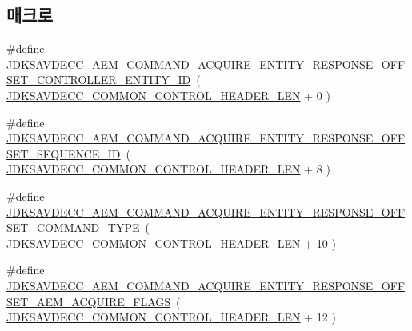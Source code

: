 \subsection*{매크로}
\begin{DoxyCompactItemize}
\item 
\#define \hyperlink{group__command__acquire__entity__response_ga0d13e0e50bafffb57a69a21b7de6083e}{J\+D\+K\+S\+A\+V\+D\+E\+C\+C\+\_\+\+A\+E\+M\+\_\+\+C\+O\+M\+M\+A\+N\+D\+\_\+\+A\+C\+Q\+U\+I\+R\+E\+\_\+\+E\+N\+T\+I\+T\+Y\+\_\+\+R\+E\+S\+P\+O\+N\+S\+E\+\_\+\+O\+F\+F\+S\+E\+T\+\_\+\+C\+O\+N\+T\+R\+O\+L\+L\+E\+R\+\_\+\+E\+N\+T\+I\+T\+Y\+\_\+\+ID}~( \hyperlink{group__jdksavdecc__avtp__common__control__header_gaae84052886fb1bb42f3bc5f85b741dff}{J\+D\+K\+S\+A\+V\+D\+E\+C\+C\+\_\+\+C\+O\+M\+M\+O\+N\+\_\+\+C\+O\+N\+T\+R\+O\+L\+\_\+\+H\+E\+A\+D\+E\+R\+\_\+\+L\+EN} + 0 )
\item 
\#define \hyperlink{group__command__acquire__entity__response_gae647be3450572f56745fa0e36a50d059}{J\+D\+K\+S\+A\+V\+D\+E\+C\+C\+\_\+\+A\+E\+M\+\_\+\+C\+O\+M\+M\+A\+N\+D\+\_\+\+A\+C\+Q\+U\+I\+R\+E\+\_\+\+E\+N\+T\+I\+T\+Y\+\_\+\+R\+E\+S\+P\+O\+N\+S\+E\+\_\+\+O\+F\+F\+S\+E\+T\+\_\+\+S\+E\+Q\+U\+E\+N\+C\+E\+\_\+\+ID}~( \hyperlink{group__jdksavdecc__avtp__common__control__header_gaae84052886fb1bb42f3bc5f85b741dff}{J\+D\+K\+S\+A\+V\+D\+E\+C\+C\+\_\+\+C\+O\+M\+M\+O\+N\+\_\+\+C\+O\+N\+T\+R\+O\+L\+\_\+\+H\+E\+A\+D\+E\+R\+\_\+\+L\+EN} + 8 )
\item 
\#define \hyperlink{group__command__acquire__entity__response_gae9ee705a07b382e8986da898b9aaf2c9}{J\+D\+K\+S\+A\+V\+D\+E\+C\+C\+\_\+\+A\+E\+M\+\_\+\+C\+O\+M\+M\+A\+N\+D\+\_\+\+A\+C\+Q\+U\+I\+R\+E\+\_\+\+E\+N\+T\+I\+T\+Y\+\_\+\+R\+E\+S\+P\+O\+N\+S\+E\+\_\+\+O\+F\+F\+S\+E\+T\+\_\+\+C\+O\+M\+M\+A\+N\+D\+\_\+\+T\+Y\+PE}~( \hyperlink{group__jdksavdecc__avtp__common__control__header_gaae84052886fb1bb42f3bc5f85b741dff}{J\+D\+K\+S\+A\+V\+D\+E\+C\+C\+\_\+\+C\+O\+M\+M\+O\+N\+\_\+\+C\+O\+N\+T\+R\+O\+L\+\_\+\+H\+E\+A\+D\+E\+R\+\_\+\+L\+EN} + 10 )
\item 
\#define \hyperlink{group__command__acquire__entity__response_ga50652ba21d54bc3894acb75dc28a16bd}{J\+D\+K\+S\+A\+V\+D\+E\+C\+C\+\_\+\+A\+E\+M\+\_\+\+C\+O\+M\+M\+A\+N\+D\+\_\+\+A\+C\+Q\+U\+I\+R\+E\+\_\+\+E\+N\+T\+I\+T\+Y\+\_\+\+R\+E\+S\+P\+O\+N\+S\+E\+\_\+\+O\+F\+F\+S\+E\+T\+\_\+\+A\+E\+M\+\_\+\+A\+C\+Q\+U\+I\+R\+E\+\_\+\+F\+L\+A\+GS}~( \hyperlink{group__jdksavdecc__avtp__common__control__header_gaae84052886fb1bb42f3bc5f85b741dff}{J\+D\+K\+S\+A\+V\+D\+E\+C\+C\+\_\+\+C\+O\+M\+M\+O\+N\+\_\+\+C\+O\+N\+T\+R\+O\+L\+\_\+\+H\+E\+A\+D\+E\+R\+\_\+\+L\+EN} + 12 )

\end{DoxyCompactItemize}
